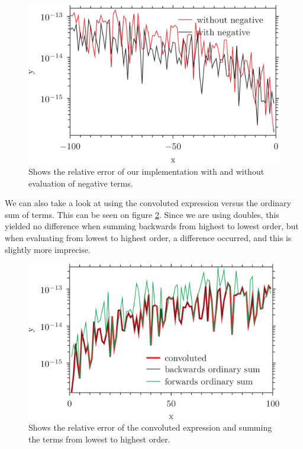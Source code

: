 \documentclass{article}
\begin{document}
\begin{figure}[h]
	\includegraphics{plot3.png}
	\caption{Shows the relative error of our implementation with and without evaluation of negative terms.}
	\label{fig:negative}
\end{figure}
We can also take a look at using the convoluted expression versus the ordinary sum of terms. This can be seen on figure \ref{fig:summation}. Since we are using doubles, this yielded no difference when summing backwards from highest to lowest order, but when evaluating from lowest to highest order, a difference occurred, and this is slightly more imprecise.
\begin{figure}[h]
	\includegraphics{plot4.png}
	\caption{Shows the relative error of the convoluted expression and summing the terms from lowest to highest order.}
	\label{fig:summation}
\end{figure}
\end{document}
